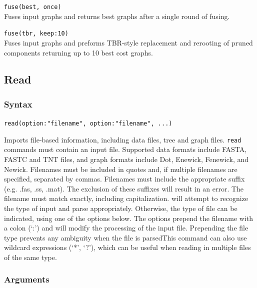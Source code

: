 	\begin{example}
	
		\item{\texttt{fuse(best, once)}\\Fuses input graphs and returns best graphs after a single round of 
		fusing.}
		
		\item{\texttt{fuse(tbr, keep:10)} \\Fuses input graphs and preforms TBR-style replacement and 
		rerooting of pruned components returning up to 10 best cost graphs.}
		
	\end{example}

\subsection{Read}
	\label{subsec:Read}
	\subsubsection{Syntax}
		\texttt{read(option:"filename", option:"filename", ...)}
			
	\begin{phygdescription}
		{Imports file-based information, including data files, tree and graph files. \texttt{read} 
		commands must contain an input file. Supported data formats include FASTA, FASTC
		and TNT files, and graph formats include Dot, Enewick, Fenewick, and Newick. 
		Filenames must be included in quotes and, if multiple filenames are specified, 
		separated by commas. Filenames must include the appropriate suffix (e.g. .fas, 
		.ss, .mat). The exclusion of these suffixes will result in an error. The filename must
		match exactly, including capitalization. \phyg will attempt to recognize the type of input
		and parse appropriately. Otherwise, the type of file can be indicated, using one of the 
		options below. The options prepend 	the filename with a colon (`:') and will modify the 
		processing of the input file. Prepending the file type prevents any ambiguity when the 
		file is parsedThis command can also use wildcard expressions (`*', `?'), 
		which can be useful when reading in multiple files of the same type.}
	\end{phygdescription}

	\subsubsection{Arguments}
	
